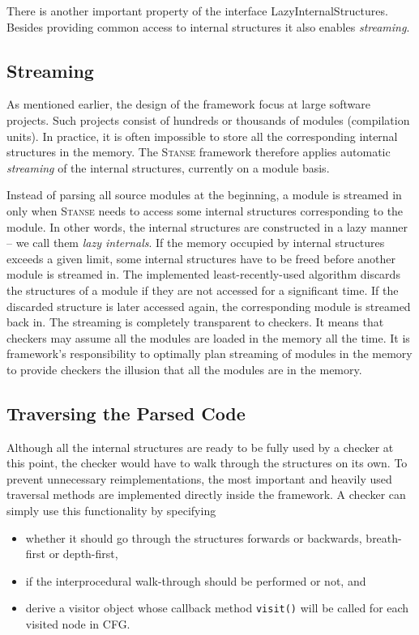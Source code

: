 \documentclass[10pt]{llncs}
\newcommand{\Stanse}{\textsc{Stanse}\xspace}
\begin{document}
There is another important property of the interface LazyInternalStructures. Besides providing common access to internal structures it also enables \emph{streaming}.

\subsection{Streaming}

As mentioned earlier, the design of the framework focus at large software projects. Such projects consist of hundreds or
thousands of modules (compilation units). In practice, it is often impossible to store all the corresponding internal structures in the memory. The \Stanse framework therefore applies automatic \emph{streaming} of the internal structures, currently on a module basis.

Instead of parsing all source modules at the beginning, a module is streamed in only when \Stanse needs to access some internal structures corresponding to the module. In other words, the internal structures are constructed in a lazy manner -- we call them \emph{lazy internals}. If the memory occupied by internal structures exceeds a given limit, some internal structures have to be freed before another module is streamed in. The implemented least-recently-used algorithm discards the structures of a module if they are not accessed for a significant time. If the discarded structure is later accessed again, the corresponding module is streamed back in. The streaming is completely transparent to checkers. It means that checkers may assume all the modules are loaded in the memory all the time. It is framework's responsibility to optimally plan streaming of modules in the memory to provide checkers the illusion that all the modules are in the memory.

\subsection{Traversing the Parsed Code}
\label{sec:traverse}

Although all the internal structures are ready to be fully used by a checker at this point, the checker would have to walk through the structures on its own. To prevent unnecessary reimplementations, the most important and heavily used traversal methods are implemented directly inside the framework. A checker can simply use this functionality by specifying
\begin{itemize}
\item whether it should go through the structures forwards or backwards, breath-first or depth-first,
\item if the interprocedural walk-through should be performed or not, and
\item derive a visitor object whose callback method \texttt{visit()} will be called for each visited node in CFG.
\end{itemize}
\end{document}
